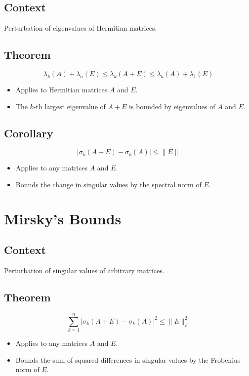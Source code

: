 \documentclass{article}
\begin{document}
\subsection{Context}
Perturbation of eigenvalues of Hermitian matrices.

\subsection{Theorem}
\[
\lambda_k(A) + \lambda_n(E) \leq \lambda_k(A + E) \leq \lambda_k(A) + \lambda_1(E)
\]
\begin{itemize}
    \item Applies to Hermitian matrices $A$ and $E$.
    \item The $k$-th largest eigenvalue of $A + E$ is bounded by eigenvalues of $A$ and $E$.
\end{itemize}

\subsection{Corollary}
\[
\lvert \sigma_k(A + E) - \sigma_k(A) \rvert \leq \lVert E \rVert
\]
\begin{itemize}
    \item Applies to any matrices $A$ and $E$.
    \item Bounds the change in singular values by the spectral norm of $E$.
\end{itemize}

\section{Mirsky's Bounds}

\subsection{Context}
Perturbation of singular values of arbitrary matrices.

\subsection{Theorem}
\[
\sum_{k=1}^{n} \lvert \sigma_k(A + E) - \sigma_k(A) \rvert^2 \leq \lVert E \rVert_F^2
\]
\begin{itemize}
    \item Applies to any matrices $A$ and $E$.
    \item Bounds the sum of squared differences in singular values by the Frobenius norm of $E$.
\end{itemize}
\end{document}
